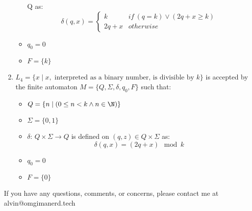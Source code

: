 \documentclass[letterpaper, 12pt]{math}
\begin{document}
\begin{enumerate}
\begin{itemize}
    Q\times\Sigma \) as:
    \[ \delta(q,x) = \begin{cases}
      k & if\ (q = k) \vee (2q+x \ge k) \\
      2q+x & otherwise
    \end{cases} \]
    \item \( q_0 = 0 \)
    \item \( F = \{k\} \)
  \end{itemize}
  \item \( L_4 = \{x\mid x,\text{ interpreted as a binary number, is divisible
  by } k\} \) is accepted by the finite automaton \( M =
  \{Q,\Sigma,\delta,q_0,F\} \) such that:
  \begin{itemize}
    \item \( Q = \{n\mid(0\le n<k \wedge n\in\N)\} \)
    \item \( \Sigma = \{0,1\} \)
    \item \( \delta \): \( Q\times\Sigma\to Q \) is defined on \( (q,z)\in
    Q\times\Sigma \) as:
    \[ \delta(q,x) = (2q+x)\mod k \]
    \item \( q_0 = 0 \)
    \item \( F = \{0\} \)
  \end{itemize}
\end{enumerate}

\begin{center}
  If you have any questions, comments, or concerns, please contact me at
  alvin@omgimanerd.tech
\end{center}
\end{document}
